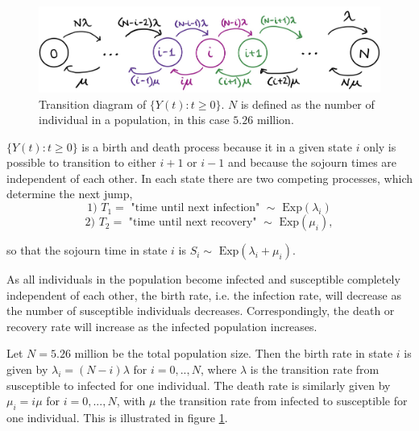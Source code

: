 \begin{figure}
    \centering
    \includegraphics[width=140mm]{TransDiag1F.png}
    \caption{Transition diagram of $\{Y(t):t \geq 0 \}$. $N$ is defined as the number of individual in a population, in this case $5.26 \text{ million.}$}
    \label{transdiagramY}
\end{figure}
$\{Y(t):t \geq 0\}$ is a birth and death process because it in a given state $i$ only is possible to transition to either $i+1$ or $i-1$ and because the sojourn times are independent of each other. In each state there are two competing processes, which determine the next jump,
$$\text{1) } T_1  = \text{ "time until next infection" } \sim \text{ Exp}(\lambda_i)$$
$$\text{2) } T_2 = \text{ "time until next recovery" } \sim \text{ Exp}(\mu_i),$$

so that the sojourn time in state $i$ is $S_i \sim \text{ Exp}(\lambda_i +\mu_i)$.

As all individuals in the population become infected and susceptible completely independent of each other, the birth rate, i.e. the infection rate, will decrease as the number of susceptible individuals decreases. Correspondingly, the death or recovery rate will increase as the infected population increases. 

Let $N=5.26 \text{ million}$ be the total population size. Then the birth rate in state $i$ is given by $\lambda_i=(N-i)\lambda$ for $i=0,..,N$, where $\lambda$ is the transition rate from susceptible to infected for one individual. The death rate is similarly given by $\mu_i = i\mu$ for $i=0,...,N$, with $\mu$ the transition rate from infected to susceptible for one individual. This is illustrated in figure \ref{transdiagramY}.

